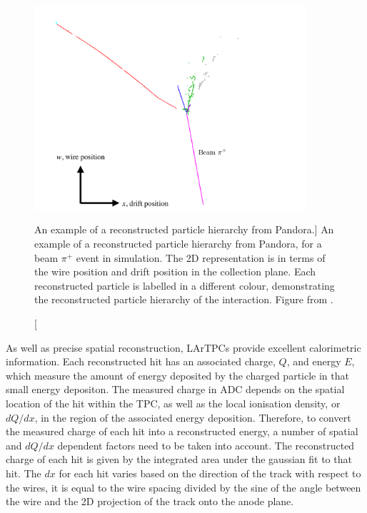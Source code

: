 \begin{figure}

	\centering

	\includegraphics[width=0.9\textwidth]{figures/pandoraEvent.pdf}

	\caption
	[An example of a reconstructed particle hierarchy from Pandora.]
	{An example of a reconstructed particle hierarchy from Pandora, for a beam
	$\pi^+$ event in \protodune{} simulation. The 2D representation is in terms 
	of the wire position and drift position in the collection plane. Each 
	reconstructed particle is labelled in a different colour, demonstrating the 
	reconstructed particle hierarchy of the interaction. Figure from 
	\cite{protoduneperf}.}

	\label{fig:pandora_pfp}

\end{figure}

As well as precise spatial reconstruction, LArTPCs provide excellent
calorimetric information. Each reconstructed hit has an associated charge, 
$Q$, and energy $E$, which measure the amount of energy deposited by the 
charged particle in that small energy depositon. The measured charge in ADC 
depends on the spatial location of the hit within the TPC, as well as the 
local ionisation density, or $dQ/dx$, in the region of the associated energy 
deposition.  Therefore, to convert the measured charge of each hit into a 
reconstructed energy, a number of spatial and $dQ/dx$ dependent factors need 
to be taken into account.  The reconstructed charge of each hit is given by 
the integrated area under the gaussian fit to that hit. The $dx$ for each hit 
varies based on the direction of the track with respect to the wires, it is 
equal to the wire spacing divided by the sine of the angle between the wire 
and the 2D projection of the track onto the anode plane.

